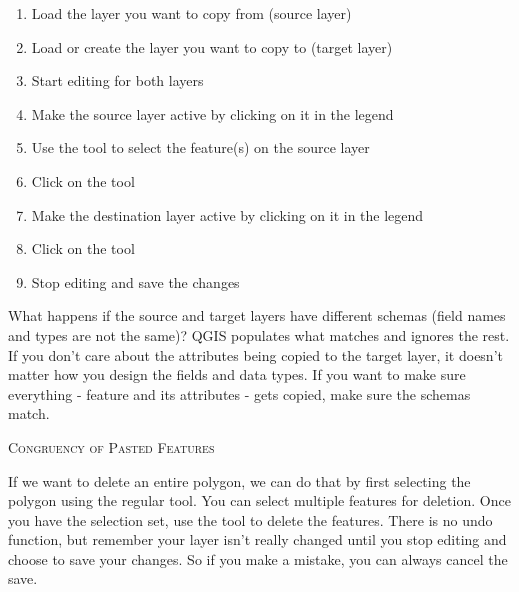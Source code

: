\begin{enumerate}
\item Load the layer you want to copy from (source layer)
\item Load or create the layer you want to copy to (target layer) 
\item Start editing for both layers 
\item Make the source layer active by clicking on it in the legend 
\item Use the  tool to select the feature(s) on the source layer
\item Click on the  tool
\item Make the destination layer active by clicking on it in the legend 
\item Click on the  tool 
\item Stop editing and save the changes
\end{enumerate}

What happens if the source and target layers have
different schemas (field names and types are not the same)? QGIS populates
what matches and ignores the rest. If you don't care about the attributes
being copied to the target layer, it doesn't matter how you design the
fields and data types. If you want to make sure everything - feature and its
attributes - gets copied, make sure the schemas match.

\begin{Tip}[ht]\caption{\textsc{Congruency of Pasted Features}}
\end{Tip}


If we want to delete an entire polygon, we can do that by first selecting 
the polygon using the regular  tool. You can select 
multiple features for deletion. Once you have the selection set, use the 
 tool to delete the features. There is no undo function, 
but remember your layer isn't really changed until you stop editing and choose 
to save your changes. So if you make a mistake, you can always cancel the save.

